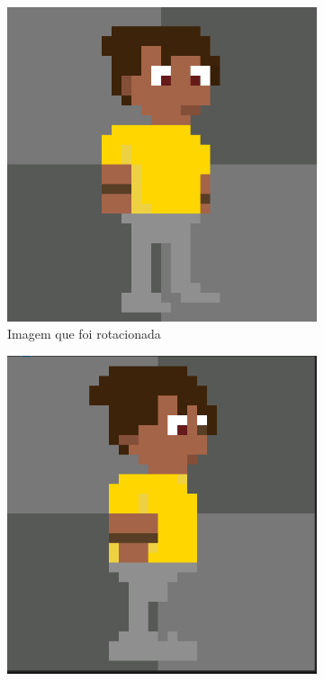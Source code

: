 \begin{figure}[htbp]
    \centering
    \caption{\small Processo da utilização 6 da ferramenta de rotação do PixelLab em julho/2025}
    \label{fig:pixelLabRotacao7}

    \begin{subfigure}{0.45\linewidth}
        \includegraphics[width=1\linewidth]{figs/pixelLab/dia2/fix_teste_4.PNG}
        \caption{\small Imagem que foi rotacionada}
        \label{fig:pixelLabRot7a}
    \end{subfigure}
    \begin{subfigure}{0.45\linewidth}
        \includegraphics[width=1\linewidth]{figs/pixelLab/dia2/rotacao 45 graus fix4 quick rotate.PNG}

\end{subfigure}
\end{figure}
